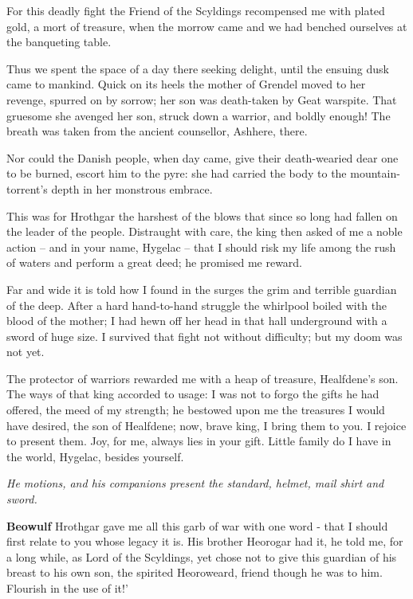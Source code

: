 \documentclass[a4paper]{article}
\begin{document}
{For this deadly fight the Friend of the Scyldings
recompensed me with plated gold,
a mort of treasure, when the morrow came
and we had benched ourselves at the banqueting table.

Thus we spent the space of a day there
seeking delight, until the ensuing dusk
came to mankind. Quick on its heels
the mother of Grendel moved to her revenge,
spurred on by sorrow; her son was death-taken
by Geat warspite. That gruesome she
avenged her son, struck down a warrior,
and boldly enough! The breath was taken
from the ancient counsellor, Ashhere, there.

Nor could the Danish people, when day came,
give their death-wearied dear one to be burned,
escort him to the pyre: she had carried the body
to the mountain-torrent’s depth in her monstrous embrace.

This was for Hrothgar the harshest of the blows
that since so long had fallen on the leader of the people.
Distraught with care, the king then asked of me
a noble action – and in your name, Hygelac –
that I should risk my life among the rush of waters
and perform a great deed; he promised me reward.

Far and wide it is told how I found in the surges
the grim and terrible guardian of the deep.
After a hard hand-to-hand struggle
the whirlpool boiled with the blood of the mother;
I had hewn off her head in that hall underground
with a sword of huge size. I survived that fight
not without difficulty; but my doom was not yet.

The protector of warriors rewarded me
with a heap of treasure, Healfdene’s son.
The ways of that king accorded to usage:
I was not to forgo the gifts he had offered,
the meed of my strength; he bestowed upon me
the treasures I would have desired, the son of Healfdene;
now, brave king, I bring them to you.
I rejoice to present them. Joy, for me, always
lies in your gift. Little family
do I have in the world, Hygelac, besides yourself.

\centerline{\textit{He motions, and his companions present the standard, helmet, mail shirt and sword.}}

\textbf{Beowulf} Hrothgar gave me all this garb of war
with one word - that I should first relate to you whose legacy it is.
His brother Heorogar had it, he told me,
for a long while, as Lord of the Scyldings,
yet chose not to give this guardian of his breast
to his own son, the spirited Heoroweard,
friend though he was to him.
Flourish in the use of it!’

}
\end{document}
